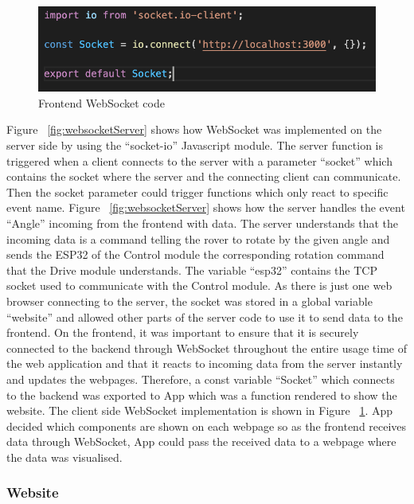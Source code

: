 \documentclass[a4paper]{article}
\begin{document}
\begin{figure}[H]
	\begin{Center}
		\includegraphics[width = 0.7\linewidth]{./images/SocketClient.png}
		\caption{Frontend WebSocket code}
        \label{fig:websocketClient}
	\end{Center}
\end{figure}

Figure ~\ref{fig:websocketServer} shows how WebSocket was implemented on the server 
side by using the “socket-io” Javascript module. \cite{WebSocketAPI} The server function is triggered 
when a client connects to the server with a parameter “socket” which contains the socket where 
the server and the connecting client can communicate. Then the socket parameter could trigger 
functions which only react to specific event name. Figure ~\ref{fig:websocketServer} shows how the server handles the 
event “Angle” incoming from the frontend with data. The server understands that the incoming 
data is a command telling the rover to rotate by the given angle and sends the ESP32 of the Control 
module the corresponding rotation command that the Drive module understands. The variable “esp32” 
contains the TCP socket used to communicate with the Control module. As there is just one 
web browser connecting to the server, the socket was stored in a global variable “website” and 
allowed other parts of the server code to use it to send data to the frontend. On the frontend, 
it was important to ensure that it is securely connected to the backend through WebSocket throughout 
the entire usage time of the web application and that it reacts to incoming data from the server 
instantly and updates the webpages. Therefore, a const variable “Socket” which connects to the 
backend was exported to App which was a function rendered to show the website. The client side WebSocket implementation 
is shown in Figure ~\ref{fig:websocketClient}. App decided which 
components are shown on each webpage so as the frontend receives data through WebSocket, App could 
pass the received data to a webpage where the data was visualised. 

\subsubsection{Website}
\end{document}
